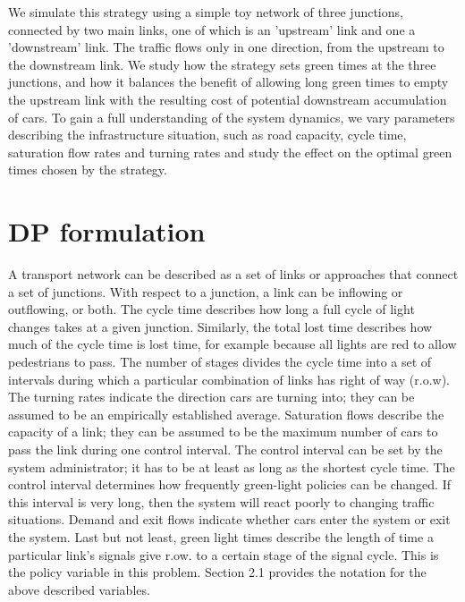 \documentclass[11pt]{article}
\begin{document}
We simulate this strategy using a simple toy network of three junctions, connected by two main links, one of which is an 'upstream' link and one a 'downstream' link. The traffic flows only in one direction, from the upstream to the downstream link. We study how the strategy sets green times at the three junctions, and how it balances the benefit of allowing long green times to empty the upstream link with the resulting cost of potential downstream accumulation of cars. To gain a full understanding of the system dynamics, we vary parameters describing the infrastructure situation, such as road capacity, cycle time, saturation flow rates and turning rates and study the effect on the optimal green times chosen by the strategy.

\section{DP formulation}
A transport network can be described as a set of links or approaches that connect a set of junctions. With respect to a junction, a link can be inflowing or outflowing, or both. The cycle time describes how long a full cycle of light changes takes at a given junction. Similarly, the total lost time describes how much of the cycle time is lost time, for example because all lights are red to allow pedestrians to pass. The number of stages divides the cycle time into a set of intervals during which a particular combination of links has right of way (r.o.w). The turning rates indicate the direction cars are turning into; they can be assumed to be an empirically established average. Saturation flows describe the capacity of a link; they can be assumed to be the maximum number of cars to pass the link during one control interval. The control interval can be set by the system administrator; it has to be at least as long as the shortest cycle time. The control interval determines how frequently green-light policies can be changed. If this interval is very long, then the system will react poorly to changing traffic situations. Demand and exit flows indicate whether cars enter the system or exit the system. Last but not least, green light times describe the length of time a particular link's signals give r.ow. to a certain stage of the signal cycle. This is the policy variable in this problem. Section 2.1 provides the notation for the above described variables.
\end{document}

